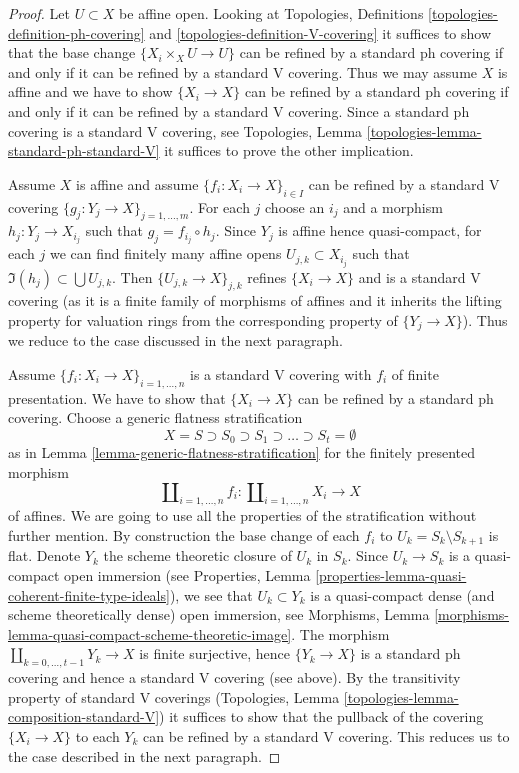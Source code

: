 \begin{proof}
Let $U \subset X$ be affine open. Looking at
Topologies, Definitions \ref{topologies-definition-ph-covering}
and \ref{topologies-definition-V-covering} it suffices to show that
the base change $\{X_i \times_X U \to U\}$ can be refined
by a standard ph covering if and only if it can be refined by
a standard V covering. Thus we may assume $X$ is affine and we have to show
$\{X_i \to X\}$ can be refined by a standard ph covering
if and only if it can be refined by a standard V covering.
Since a standard ph covering is a standard V covering, see
Topologies, Lemma \ref{topologies-lemma-standard-ph-standard-V}
it suffices to prove the other implication.

\medskip\noindent
Assume $X$ is affine and assume $\{f_i : X_i \to X\}_{i \in I}$
can be refined by a standard V covering
$\{g_j : Y_j \to X\}_{j = 1, \ldots, m}$.
For each $j$ choose an $i_j$ and a morphism
$h_j : Y_j \to X_{i_j}$ such that $g_j = f_{i_j} \circ h_j$.
Since $Y_j$ is affine hence quasi-compact,
for each $j$ we can find finitely many affine opens
$U_{j, k} \subset X_{i_j}$ such that $\Im(h_j) \subset \bigcup U_{j, k}$.
Then $\{U_{j, k} \to X\}_{j, k}$ refines $\{X_i \to X\}$
and is a standard V covering (as it is a finite family of morphisms
of affines and it inherits the lifting property for valuation rings
from the corresponding property of $\{Y_j \to X\}$).
Thus we reduce to the case discussed in the next paragraph.

\medskip\noindent
Assume $\{f_i : X_i \to X\}_{i = 1, \ldots, n}$
is a standard V covering with $f_i$ of finite presentation.
We have to show that $\{X_i \to X\}$ can be refined by a standard ph covering.
Choose a generic flatness stratification
$$
X = S \supset S_0 \supset S_1 \supset \ldots \supset S_t = \emptyset
$$
as in Lemma \ref{lemma-generic-flatness-stratification}
for the finitely presented morphism
$$
\coprod\nolimits_{i = 1, \ldots, n} f_i :
\coprod\nolimits_{i = 1, \ldots, n} X_i
\longrightarrow
X
$$
of affines. We are going to use all the properties of the stratification
without further mention. By construction the base change of each $f_i$ to
$U_k = S_k \setminus S_{k + 1}$ is flat.
Denote $Y_k$ the scheme theoretic closure of $U_k$ in $S_k$. Since
$U_k \to S_k$ is a quasi-compact open immersion (see
Properties, Lemma \ref{properties-lemma-quasi-coherent-finite-type-ideals}),
we see that $U_k \subset Y_k$ is a quasi-compact dense
(and scheme theoretically dense) open immersion, see
Morphisms, Lemma \ref{morphisms-lemma-quasi-compact-scheme-theoretic-image}.
The morphism $\coprod_{k = 0, \ldots, t - 1} Y_k \to X$
is finite surjective, hence $\{Y_k \to X\}$ is a standard ph covering
and hence a standard V covering (see above). By the transitivity
property of standard V coverings
(Topologies, Lemma \ref{topologies-lemma-composition-standard-V})
it suffices to show that the pullback of
the covering $\{X_i \to X\}$ to each $Y_k$ can be refined by a
standard V covering. This reduces us to the case described in the
next paragraph.


\end{proof}
